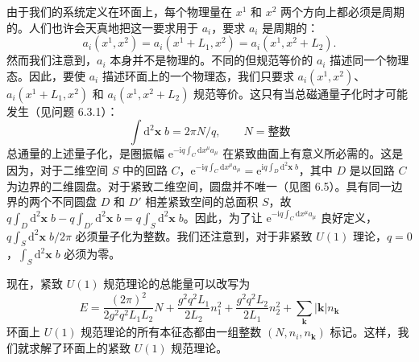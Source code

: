 由于我们的系统定义在环面上，每个物理量在 $x^1$ 和 $x^2$ 两个方向上都必须是周期的。人们也许会天真地把这一要求用于 $a_i$，要求 $a_i$ 是周期的：
\begin{equation*}
a_i(x^1, x^2) = a_i(x^1 + L_1, x^2) = a_i(x^1, x^2 + L_2).
\end{equation*}
然而我们注意到，$a_i$ 本身并不是物理的。不同的但规范等价的 $a_i$ 描述同一个物理态。因此，要使 $a_i$ 描述环面上的一个物理态，我们只要求 $a_i(x^1, x^2)$、$a_i(x^1 + L_1, x^2)$ 和 $a_i(x^1, x^2 + L_2)$ 规范等价。这只有当总磁通量子化时才可能发生（见问题 6.3.1）：
\begin{equation*}
\int \mathrm{d}^2\pmb{x}\; b = 2\pi N/q, \qquad N = \text{整数}\tag{6.3.6}
\end{equation*}
总通量的上述量子化，是圈振幅 $\mathrm{e}^{-\mathrm{i} q \int_C \mathrm{d}x^\mu a_\mu}$ 在紧致曲面上有意义所必需的。这是因为，对于二维空间 $S$ 中的回路 $C$，$\mathrm{e}^{-\mathrm{i} q \int_C \mathrm{d}x^\mu a_\mu} = \mathrm{e}^{\mathrm{i} q \int_D \mathrm{d}^2\pmb{x}\; b}$，其中 $D$ 是以回路 $C$ 为边界的二维圆盘。对于紧致二维空间，圆盘并不唯一（见图 6.5）。具有同一边界的两个不同圆盘 $D$ 和 $D'$ 相差紧致空间的总面积 $S$，故 $q\int_D \mathrm{d}^2\pmb{x}\; b - q\int_{D'} \mathrm{d}^2\pmb{x}\; b = q\int_S \mathrm{d}^2\pmb{x}\; b$。因此，为了让 $\mathrm{e}^{-\mathrm{i} q \int_C \mathrm{d}x^\mu a_\mu}$ 良好定义，$q\int_S \mathrm{d}^2\pmb{x}\; b/2\pi$ 必须量子化为整数。我们还注意到，对于非紧致 $U(1)$ 理论，$q = 0$，$\int_S \mathrm{d}^2\pmb{x}\; b$ 必须为零。

现在，紧致 $U(1)$ 规范理论的总能量可以改写为
\begin{equation*}
E = \frac{(2\pi)^2}{2g^2 q^2 L_1 L_2} N + \frac{g^2 q^2 L_1}{2L_2} n_1^2 + \frac{g^2 q^2 L_2}{2L_1} n_2^2 + \sum_{\pmb{k}} |\pmb{k}| n_{\pmb{k}}\tag{6.3.7}
\end{equation*}
环面上 $U(1)$ 规范理论的所有本征态都由一组整数 $(N, n_i, n_{\pmb{k}})$ 标记。这样，我们就求解了环面上的紧致 $U(1)$ 规范理论。


